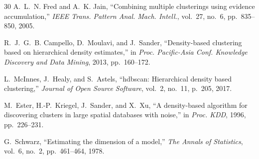 \documentclass[journal]{IEEEtran}
\begin{document}
\begin{thebibliography}{30}
A.~L.~N. Fred and A.~K. Jain, ``Combining multiple clusterings using evidence accumulation,'' \textit{IEEE Trans. Pattern Anal. Mach. Intell.}, vol.~27, no.~6, pp.~835--850, 2005.

R.~J.~G.~B. Campello, D.~Moulavi, and J.~Sander, ``Density-based clustering based on hierarchical density estimates,'' in \textit{Proc. Pacific-Asia Conf. Knowledge Discovery and Data Mining}, 2013, pp.~160--172.

L.~McInnes, J.~Healy, and S.~Astels, ``hdbscan: Hierarchical density based clustering,'' \textit{Journal of Open Source Software}, vol.~2, no.~11, p.~205, 2017.

M.~Ester, H.-P.~Kriegel, J.~Sander, and X.~Xu, ``A density-based algorithm for discovering clusters in large spatial databases with noise,'' in \textit{Proc. KDD}, 1996, pp.~226--231.

G.~Schwarz, ``Estimating the dimension of a model,'' \textit{The Annals of Statistics}, vol.~6, no.~2, pp.~461--464, 1978.
\end{thebibliography}
\end{document}
